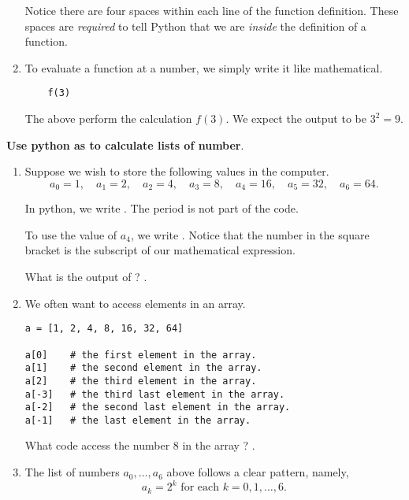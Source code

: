 \documentclass[../main.tex]{subfiles}
\begin{document}
\begin{enumerate}
    \faExclamationTriangle{} Notice there are four spaces within each line of the function definition. These spaces are \emph{required} to tell Python that we are \emph{inside} the definition of a function. 

  \item To evaluate a function at a number, we simply write it like mathematical.
    \begin{verbatim}
    f(3)
    \end{verbatim}
    The above perform the calculation \(f(3)\). We expect the output to be \(3^{2} = 9\).

\end{enumerate}

\textbf{Use python as to calculate lists of number}.
\begin{enumerate}
  \item Suppose we wish to store the following values in the computer. 
    \[
      a_{0} = 1, \quad a_{1} = 2, \quad a_{2} = 4, \quad  a_{3} = 8, \quad a_{4} = 16, \quad a_{5} = 32, \quad a_{6} = 64.
    \]

    In python, we write .  The period is not part of the code.

    To use the value of \(a_{4}\), we write .  Notice that the number in the square bracket is the subscript of our mathematical expression.

    \faComment{} What is the output of ? \underline{\hspace{2in}}.

  \item We often want to access elements in an array.  
    \begin{verbatim}
a = [1, 2, 4, 8, 16, 32, 64]

a[0]    # the first element in the array.
a[1]    # the second element in the array.
a[2]    # the third element in the array.
a[-3]   # the third last element in the array. 
a[-2]   # the second last element in the array. 
a[-1]   # the last element in the array.
    \end{verbatim}
    
    \faComment{} What code access the number \(8\) in the array ? \underline{\hspace{1in}}.

  \item The list of numbers \(a_{0}, \ldots, a_{6}\) above follows a clear pattern, namely, 
    \[
      a_{k} = 2^{k} \text{ for each } k = 0, 1, \ldots, 6.
    \]
    

\end{enumerate}
\end{document}
